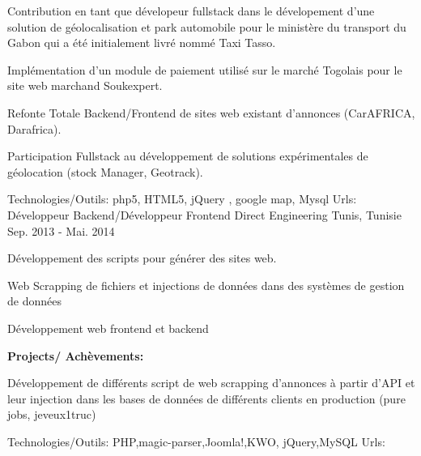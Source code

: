 \begin{cventries}
{\begin{cvitems}
	{\vspace{14pt}}
        \item {Contribution en tant que dévelopeur fullstack dans le dévelopement d'une solution de géolocalisation et park automobile pour le ministère du transport du Gabon qui a été initialement livré nommé Taxi Tasso.}
        \item {Implémentation d'un module de paiement utilisé sur le marché Togolais pour le site web marchand Soukexpert. }
        \item {Refonte Totale Backend/Frontend de sites web existant d'annonces (CarAFRICA, Darafrica).}
        \item {Participation Fullstack au développement de solutions expérimentales de géolocation (stock Manager, Geotrack).}
      \end{cvitems}
    }
    {\textcolor{awesome}{Technologies/Outils: } {\color{graytext}}  {php5, HTML5, jQuery , google map, Mysql}}   
     {Urls:} 
    {    
\href{http://www.skopeo.fr/solutions.html }{} \break
    }        	
  \techentries
    {Développeur Backend/Développeur Frontend}
    {Direct Engineering}
    {Tunis, Tunisie}
    {Sep. 2013 - Mai. 2014}
    {
      \begin{cvitems}
        \item {Développement des scripts pour générer des sites web.}
        \item {Web Scrapping de fichiers et injections de données dans des systèmes de gestion de données}
        \item {Développement web frontend et backend}
      \end{cvitems}
	\vspace{10pt}\textbf{Projects/ Achèvements:}
      \begin{cvitems}
	{\vspace{14pt}}
        \item {Développement de différents script de web scrapping d'annonces à partir d'API et leur injection dans les bases de données de différents clients en production (pure jobs, jeveux1truc) }
      \end{cvitems}
    }
    {\textcolor{awesome}{Technologies/Outils: } {\color{graytext}}  {PHP,magic-parser,Joomla!,KWO, jQuery,MySQL}}
    {Urls:} 
    {\href{http://www.pure-jobs.com/}{} \break
    }       
\end{cventries}
